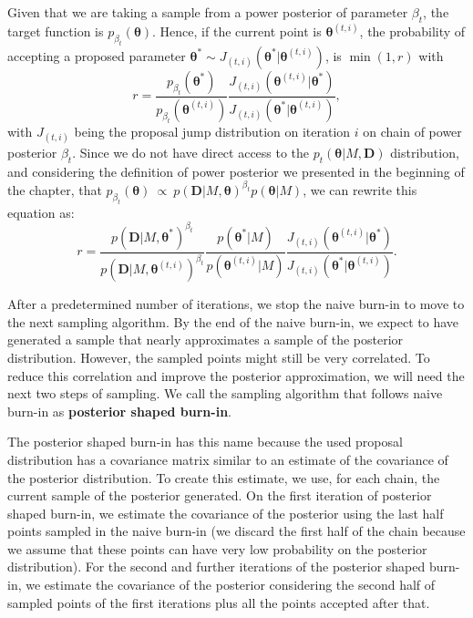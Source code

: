 Given that we are taking a sample from a power posterior of parameter
$\beta_t$, the target function is  $p_{\beta_t} ({\bm
\theta})$. Hence, if the current point is ${\bm \theta}^{(t, i)}$, the 
probability of accepting a proposed parameter 
${\bm \theta}^* \sim J_{(t, i)} ({\bm \theta}^* | {\bm \theta}^{(t,
i)})$, is $\min (1, r)$ with
\begin{equation*}
    r = \frac{p_{\beta_t} ({\bm \theta}^*)}
             {p_{\beta_t} ({\bm \theta}^{(t, i)})}
        \frac{J_{(t, i)} ({\bm \theta}^{(t, i)} | {\bm \theta}^*)}
             {J_{(t, i)} ({\bm \theta}^* | {\bm \theta}^{(t, i)})},
\end{equation*}
with $J_{(t, i)}$ being the proposal jump distribution on iteration $i$ 
on chain of power posterior $\beta_t$. Since we do not have direct
access to the $p_t({\bm \theta} | M, {\bm D})$ distribution, and
considering the definition of power posterior we presented in the 
beginning of the chapter, that $p_{\beta_t} ({\bm \theta})~\propto~p
({\bm D}|M, {\bm \theta})^{\beta_t} p ({\bm \theta} | M)$, we can 
rewrite this equation as:
\begin{equation}
    r = \frac{p ({\bm D} | M, {\bm \theta}^*)^{\beta_t}}
             {p ({\bm D} | M, {\bm \theta}^{(t, i)})^{\beta_t}}
        \frac{p ({\bm \theta}^* | M)}
             {p ({\bm \theta}^{(t, i)} | M)}
        \frac{J_{(t, i)} ({\bm \theta}^{(t, i)} | {\bm \theta}^*)}
             {J_{(t, i)} ({\bm \theta}^* | {\bm \theta}^{(t, i)})}.
    \label{eq:mh_ratio_step1}
\end{equation}

After a predetermined number of iterations, we stop the naive burn-in
to move to the next sampling algorithm. By the end of the naive burn-in,
we expect to have generated a sample that nearly approximates a sample
of the posterior distribution. However, the sampled points might still
be very correlated. To reduce this correlation and improve the posterior
approximation, we will need the next two steps of sampling. We call the 
sampling algorithm that follows naive burn-in as {\bf posterior shaped
burn-in}.

The posterior shaped burn-in has this name because the used proposal
distribution has a covariance matrix similar to an estimate of the 
covariance of the posterior distribution. To create this estimate, we 
use, for each chain, the current sample of the posterior generated. On 
the first iteration of posterior shaped burn-in, we estimate the 
covariance of the posterior using the last half points sampled in the 
naive burn-in (we discard the first half of the chain because we assume 
that these points can have very low probability on the posterior 
distribution). For the second and further iterations of the posterior
shaped burn-in, we estimate the covariance of the posterior considering
the second half of sampled points of the first iterations plus all the
points accepted after that.

